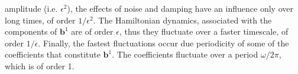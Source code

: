 amplitude (i.e. $\epsilon^2$), the effects of noise and damping have an
influence only over long times, of order $1/\epsilon^2$. The
Hamiltonian dynamics, associated with the components of
$\boldsymbol{b}^1$ are of order $\epsilon$, thus they fluctuate over a
faster timescale, of order $1/\epsilon$. Finally, the fastest
fluctuations occur due periodicity of some of the coefficients that
constitute $\boldsymbol{b}^1$. The coefficients fluctuate over a
period $\omega/2\pi$, which is of order 1. %

